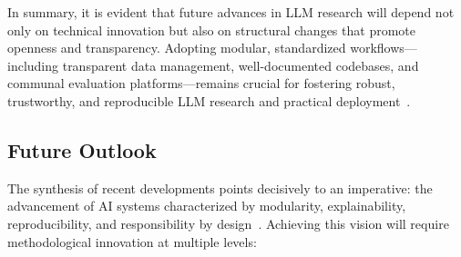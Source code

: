 \documentclass[sigconf]{acmart}
\begin{document}
In summary, it is evident that future advances in LLM research will depend not only on technical innovation but also on structural changes that promote openness and transparency. Adopting modular, standardized workflows—including transparent data management, well-documented codebases, and communal evaluation platforms—remains crucial for fostering robust, trustworthy, and reproducible LLM research and practical deployment~\cite{ref81,ref82,ref83,ref86,ref91}.

\subsection{Future Outlook}

The synthesis of recent developments points decisively to an imperative: the advancement of AI systems characterized by modularity, explainability, reproducibility, and responsibility by design~\cite{ref91,ref92,ref93,ref94,ref95,ref96,ref97,ref98,ref99,ref100,ref101,ref102,ref103,ref104,ref105,ref106,ref107,ref108}. Achieving this vision will require methodological innovation at multiple levels:
\end{document}
